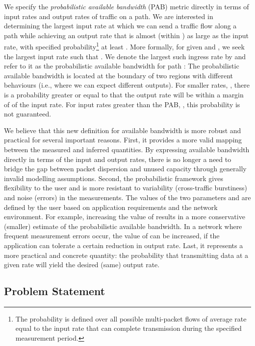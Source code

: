 \documentclass[final,5p,times,twocolumn]{elsarticle}
\begin{document}
We specify the {\em probabilistic available bandwidth} (PAB) metric directly in terms of input rates and output rates of traffic on a path.  We are interested in determining the largest input rate  at which we can send a traffic flow along a path while achieving an output rate  that is almost (within ) as large as the input rate, with specified probability\footnote{The probability is defined over all possible multi-packet flows of average rate equal to the input rate that can complete transmission during the specified measurement period.} at least .  More formally, for given  and , we seek the largest input rate such that .  We denote the largest such ingress rate by  and refer to it as the probabilistic available bandwidth for path :   The probabilistic available bandwidth is located at the boundary of two regions with different behaviours (i.e., where we can expect different outputs).  For smaller rates,  , there is a probability greater or equal to  that the output rate will be within a margin of  of the input rate.  For input rates greater than the PAB, , this probability is not guaranteed.  

We believe that this new definition for available bandwidth is more robust and practical for several important reasons.  First, it provides a more valid mapping between the measured and inferred quantities.  By expressing available bandwidth directly in terms of the input and output rates, there is no longer a need to bridge the gap between packet dispersion and unused capacity through generally invalid modelling assumptions.  Second, the probabilistic framework gives flexibility to the user and is more resistant to variability (cross-traffic burstiness) and noise (errors) in the measurements.  The values of the two parameters  and  are defined by the user based on application requirements and the network environment.  For example, increasing the value of  results in a more conservative (smaller) estimate of the probabilistic available bandwidth.  In a network where frequent measurement errors occur, the value of  can be increased, if the application can tolerate a certain reduction in output rate.  Last, it represents a more practical and concrete quantity: the probability that transmitting data at a given rate will yield the desired (same) output rate.





\subsection{Problem Statement}
\label{ssec:ps}
\end{document}
